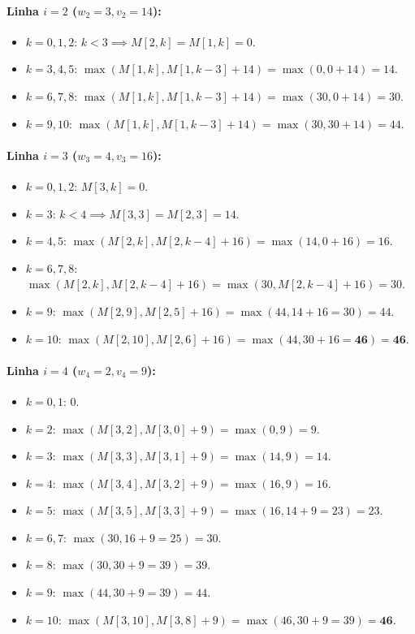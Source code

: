 \documentclass[11pt,a4paper]{article}
\begin{document}
\paragraph{Linha $i = 2$ ($w_2 = 3, v_2 = 14$):}
\begin{itemize}
    \item $k = 0, 1, 2$: $k < 3 \implies M[2, k] = M[1, k] = 0$.
    \item $k = 3, 4, 5$: $\max(M[1, k], M[1, k-3] + 14) = \max(0, 0 + 14) = 14$.
    \item $k = 6, 7, 8$: $\max(M[1, k], M[1, k-3] + 14) = \max(30, 0 + 14) = 30$.
    \item $k = 9, 10$: $\max(M[1, k], M[1, k-3] + 14) = \max(30, 30 + 14) = 44$.
\end{itemize}

\paragraph{Linha $i = 3$ ($w_3 = 4, v_3 = 16$):}
\begin{itemize}
    \item $k = 0, 1, 2$: $M[3, k] = 0$.
    \item $k = 3$: $k < 4 \implies M[3, 3] = M[2, 3] = 14$.
    \item $k = 4, 5$: $\max(M[2, k], M[2, k-4] + 16) = \max(14, 0 + 16) = 16$.
    \item $k = 6, 7, 8$: $\max(M[2, k], M[2, k-4] + 16) = \max(30, M[2, k-4] + 16) = 30$.
    \item $k = 9$: $\max(M[2, 9], M[2, 5] + 16) = \max(44, 14 + 16 = 30) = 44$.
    \item $k = 10$: $\max(M[2, 10], M[2, 6] + 16) = \max(44, 30 + 16 = \mathbf{46}) = \mathbf{46}$.
\end{itemize}

\paragraph{Linha $i = 4$ ($w_4 = 2, v_4 = 9$):}
\begin{itemize}
    \item $k = 0, 1$: $0$.
    \item $k = 2$: $\max(M[3, 2], M[3, 0] + 9) = \max(0, 9) = 9$.
    \item $k = 3$: $\max(M[3, 3], M[3, 1] + 9) = \max(14, 9) = 14$.
    \item $k = 4$: $\max(M[3, 4], M[3, 2] + 9) = \max(16, 9) = 16$.
    \item $k = 5$: $\max(M[3, 5], M[3, 3] + 9) = \max(16, 14 + 9 = 23) = 23$.
    \item $k = 6, 7$: $\max(30, 16 + 9 = 25) = 30$.
    \item $k = 8$: $\max(30, 30 + 9 = 39) = 39$.
    \item $k = 9$: $\max(44, 30 + 9 = 39) = 44$.
    \item $k = 10$: $\max(M[3, 10], M[3, 8] + 9) = \max(46, 30 + 9 = 39) = \mathbf{46}$.
\end{itemize}
\end{document}
